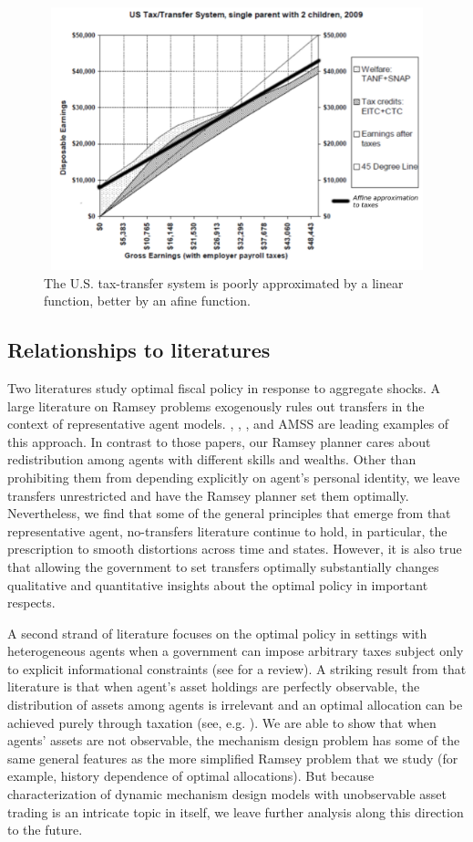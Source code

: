 \documentclass[thmsb,11pt]{article}
\begin{document}
  \begin{figure}[htp]
 \centering
 \includegraphics[width=5in,height=3in]{Draft25Graphs/affine_taxes.pdf}
 \caption{ The U.S. tax-transfer system is poorly approximated by a linear function, better by an afine
function.}
 \label{fig:affine_taxes}
 \end{figure}


\subsection{Relationships to literatures}

Two literatures study optimal fiscal policy in
response to  aggregate shocks. A large  literature on Ramsey problems  exogenously rules out transfers in
the context of
representative agent models.
 \citet{Barro1979}, \citet{LucasJr.1983}, \citet{Chari1994},  and AMSS are leading  examples of this approach.
In contrast to those papers, our Ramsey planner cares about redistribution among
agents with different skills and wealths. Other than prohibiting them from depending explicitly
on agent's personal identity, we leave   transfers unrestricted and have the Ramsey planner set
them optimally. Nevertheless, we find that  some of the general principles that emerge from that
representative agent, no-transfers literature continue to hold, in particular, the prescription to
smooth distortions across time and states.  However, it is also true that
allowing the government to set transfers optimally substantially changes
qualitative and quantitative insights about the optimal policy in important respects.

A second strand of literature focuses on the optimal policy in settings with
heterogeneous agents when a government can impose arbitrary taxes subject only
to explicit informational constraints (see \citet{golosov2007new} for a review). A striking result from that literature
is that when  agent's asset holdings are perfectly observable, the distribution of assets among
agents is irrelevant and an optimal allocation can be achieved purely through
taxation (see, e.g. \citet{Bassetto2004}).   We are able to show that when
agents' assets are not observable, the mechanism design problem has some of
the same general features as the more simplified Ramsey problem that we
study (for example, history dependence of optimal allocations).  But because  characterization of dynamic mechanism design models with
unobservable asset trading is an intricate topic in itself, we leave further analysis along this
direction to the  future.
\end{document}
